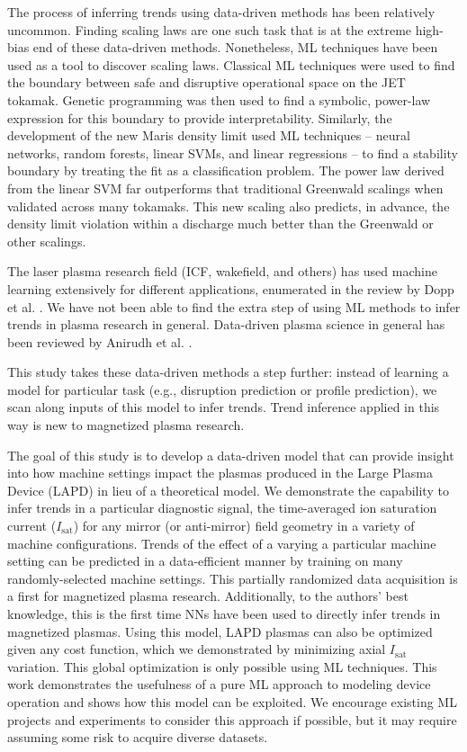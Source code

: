 The process of inferring trends using data-driven methods has been relatively uncommon. Finding scaling laws are one such task that is at the extreme high-bias end of these data-driven methods. Nonetheless, ML techniques have been used as a tool to discover scaling laws. Classical ML techniques were used to find the boundary between safe and disruptive operational space on the JET tokamak\cite{murari_investigating_2020}. Genetic programming was then used to find a symbolic, power-law expression for this boundary to provide interpretability. Similarly, the development of the new Maris density limit\cite{maris_correlation_2024} used ML techniques -- neural networks, random forests, linear SVMs, and linear regressions -- to find a stability boundary by treating the fit as a classification problem. The power law derived from the linear SVM far outperforms that traditional Greenwald scalings when validated across many tokamaks. This new scaling also predicts, in advance, the density limit violation within a discharge much better than the Greenwald or other scalings. 

The laser plasma research field (ICF, wakefield, and others) has used machine learning extensively for different applications, enumerated in the review by Dopp et al. \cite{dopp_data-driven_2023}. We have not been able to find the extra step of using ML methods to infer trends in plasma research in general. Data-driven plasma science in general has been reviewed by Anirudh et al. \cite{anirudh_2022_2023}.

This study takes these data-driven methods a step further: instead of learning a model for particular task (e.g., disruption prediction or profile prediction), we scan along inputs of this model to infer trends. Trend inference applied in this way is new to magnetized plasma research. 

The goal of this study is to develop a data-driven model that can provide insight into how machine settings impact the plasmas produced in the Large Plasma Device (LAPD) in lieu of a theoretical model. We demonstrate the capability to infer trends in a particular diagnostic signal, the time-averaged ion saturation current ($I_\text{sat}$) for any mirror (or anti-mirror) field geometry in a variety of machine configurations. Trends of the effect of a varying a particular machine setting can be predicted in a data-efficient manner by training on many randomly-selected machine settings. This partially randomized data acquisition is a first for magnetized plasma research. Additionally, to the authors' best knowledge, this is the first time NNs have been used to directly infer trends in magnetized plasmas. Using this model, LAPD plasmas can also be optimized given any cost function, which we demonstrated by minimizing axial $I_\text{sat}$ variation. This global optimization is only possible using ML techniques. This work demonstrates the usefulness of a pure ML approach to modeling device operation and shows how this model can be exploited. We encourage existing ML projects and experiments to consider this approach if possible, but it may require assuming some risk to acquire diverse datasets.

